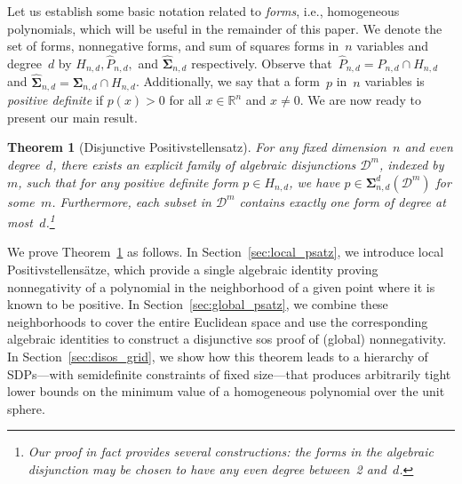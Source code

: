 \documentclass[12pt]{article}
\newcommand{\reals}{\mathbb{R}}
\newcommand{\NN}{P}
\newcommand{\SOS}{\mathbf{\Sigma}}
\newcommand{\HNN}{\widehat{P}}
\newcommand{\HSOS}{\widehat{\mathbf{\Sigma}}}
\newcommand{\DiSOS}{\mathbf{\Sigma}}
\newcommand{\mcD}{\mathcal{D}}
\newtheorem{theorem}{Theorem}%
\theoremstyle{remark}
\begin{document}
Let us establish some basic notation related to \emph{forms}, i.e., homogeneous polynomials, which will be useful in the remainder of this paper.
We denote the set of forms, nonnegative forms, and sum of squares forms in~$n$ variables and degree~$d$ by $H_{n,d},\HNN_{n,d},$ and $\HSOS_{n,d}$ respectively. 
Observe that~$\HNN_{n,d}=\NN_{n,d}\cap H_{n,d}$ and $\HSOS_{n,d}=\SOS_{n,d}\cap H_{n,d}$. 
Additionally, we say that a form~$p$ in~$n$ variables is \emph{positive definite} if $p(x)>0$ for all $x\in\reals^n$ and $x\neq0$.
We are now ready to present our main result.
\begin{theorem}[Disjunctive Positivstellensatz]\label{cor:strictly_pos}
For any fixed dimension~$n$ and even degree~$d$, there exists an explicit family of algebraic disjunctions
$\mcD^m$, indexed by $m$, such that for any positive
 definite form $p\in H_{n,d}$, we have $p\in \DiSOS_{n,d}^{d}(\mcD^m)$ for some~$m$. Furthermore, each subset in $\mcD^m$ contains exactly one form of degree at most~$d$.\footnote{Our proof in fact provides several constructions: the forms in the algebraic disjunction may be chosen to have any even degree between~2 and~$d$.}
\end{theorem}

We prove Theorem~\ref{cor:strictly_pos} as follows.
In Section~\ref{sec:local_psatz}, we introduce local Positivstellens\"atze, which provide a single algebraic identity proving nonnegativity of a polynomial in the neighborhood of a given point where it is known to be positive.
In Section~\ref{sec:global_psatz}, we combine these neighborhoods to cover the entire Euclidean space and use the corresponding algebraic identities to construct a disjunctive sos proof of (global) nonnegativity.
In Section~\ref{sec:disos_grid}, we show how this theorem leads to a hierarchy of SDPs---with semidefinite constraints of fixed size---that produces arbitrarily tight lower bounds on the minimum value of a homogeneous polynomial over the unit sphere. 
\end{document}
